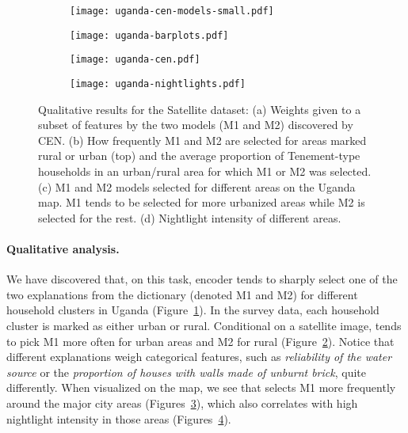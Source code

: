 \documentclass[twoside,11pt]{article}
\begin{document}
\begin{figure}[t]
\begin{subfigure}[b]{0.19\textwidth}
    \hspace{-1.5ex}
    \texttt{[image: uganda-cen-models-small.pdf]}\vspace{-2ex}\caption{}\label{fig:satellite-models}
\end{subfigure}\begin{subfigure}[b]{0.19\textwidth}
    \hspace{-0.5ex}
    \texttt{[image: uganda-barplots.pdf]}\vspace{-2ex}\caption{}\label{fig:satellite-barplots}
\end{subfigure}\begin{subfigure}[b]{0.31\textwidth}
    \hspace{1.5ex}
    \texttt{[image: uganda-cen.pdf]}\vspace{-2ex}\caption{}\label{fig:satellite-map-cen}
\end{subfigure}\begin{subfigure}[b]{0.31\textwidth}
    \hspace{1.5ex}
    \texttt{[image: uganda-nightlights.pdf]}\vspace{-2ex}\caption{}\label{fig:satellite-map-nl}
\end{subfigure}
\caption{Qualitative results for the Satellite dataset:
(a) Weights given to a subset of features by the two models (M1 and M2) discovered by CEN.
(b) How frequently M1 and M2 are selected for areas marked rural or urban (top) and the average proportion of Tenement-type households in an urban/rural area for which M1 or M2 was selected.
(c) M1 and M2 models selected for different areas on the Uganda map.
M1 tends to be selected for more urbanized areas while M2 is selected for the rest.
(d) Nightlight intensity of different areas.}
\label{fig:satellite}
\end{figure}
 
\paragraph{Qualitative analysis.}
We have discovered that, on this task, {\CEN} encoder tends to sharply select one of the two explanations from the dictionary (denoted M1 and M2) for different household clusters in Uganda (Figure~\ref{fig:satellite-models}).
In the survey data, each household cluster is marked as either urban or rural.
Conditional on a satellite image, {\CEN} tends to pick M1 more often for urban areas and M2 for rural (Figure~\ref{fig:satellite-barplots}).
Notice that different explanations weigh categorical features, such as \emph{reliability of the water source} or the \emph{proportion of houses with walls made of unburnt brick}, quite differently.
When visualized on the map, we see that {\CEN} selects M1 more frequently around the major city areas (Figures~\ref{fig:satellite-map-cen}), which also correlates with high nightlight intensity in those areas (Figures~\ref{fig:satellite-map-nl}).
\end{document}

